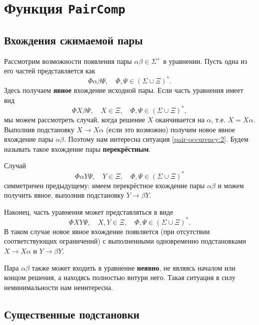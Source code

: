 \documentclass[12pt]{article}
\begin{document}
\section{Функция \texttt{PairComp}}


\subsection{Вхождения сжимаемой пары} \label{pair-occurency}

Рассмотрим возможности появления пары $\alpha \beta \in \Sigma^+ $ в
уравнении. Пусть одна из его частей представляется как 
\begin{equation}
  \Phi \alpha \beta \Psi, \quad \Phi, \Psi \in (\Sigma \cup \Xi)^*.
\end{equation}
Здесь получаем \textbf{явное} вхождение исходной пары. Если часть уравнения
имеет вид
\begin{equation} \label{pair-occurency:2}
  \Phi X \beta \Psi, \quad X \in \Xi, \quad \Phi, \Psi \in (\Sigma \cup \Xi)^*,
\end{equation}
мы можем рассмотреть случай, когда решение $X$ оканчивается на $\alpha$, т.е.
$X = X\alpha$. Выполнив подстановку $X \to X\alpha$ (если это возможно)
получим новое явное вхождение пары $\alpha \beta$. Поэтому нам интересна
ситуация \ref{pair-occurency:2}. Будем называть такое вхождение пары
\textbf{перекрёстным}.

Случай
\begin{equation} \label{pair-occurency:3}
  \Phi \alpha Y \Psi, \quad Y \in \Xi, \quad \Phi, \Psi \in (\Sigma \cup \Xi)^*
\end{equation}
симметричен предыдущему: имеем перекрёстное вхождение пары $\alpha \beta$ и
можем получить явное, выполнив подстановку $Y \to \beta Y$.

Наконец, часть уравнения может представляться в виде
\begin{equation} \label{pair-occurency:4}
  \Phi X Y \Psi, \quad X, Y \in \Xi, \quad \Phi, \Psi \in (\Sigma \cup \Xi)^*.
\end{equation}
В таком случае новое явное вхождение появляется (при отсутствии соответствующих
ограничений) с выполненными одновременно подстановками $X \to X \alpha$ и
$Y \to \beta Y$.

Пара $\alpha \beta$ также может входить в уравнение \textbf{неявно}, не являясь
началом или концом решения, а находясь полностью внтури него. Такая
ситуация в силу неминимальности нам неинтересна.


\subsection{Существенные подстановки} \label{essential-substs}
\end{document}
